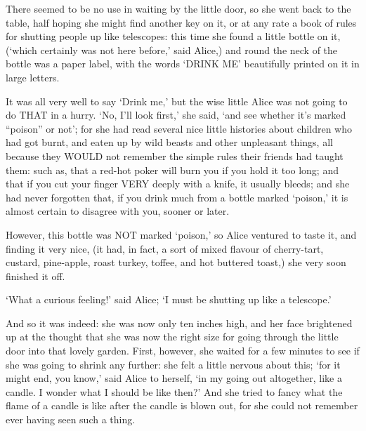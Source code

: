 \documentclass[12pt]{book}
\begin{document}
\begin{Parallel}[p]{}{}
{There seemed to be no use in waiting by the little door, so she went back to the table, half hoping she might find another key on it, or at any rate a book of rules for shutting people up like telescopes: this time she found a little bottle on it, (‘which certainly was not here before,’ said Alice,) and round the neck of the bottle was a paper label, with the words ‘DRINK ME’ beautifully printed on it in large letters.

It was all very well to say ‘Drink me,’ but the wise little Alice was not going to do THAT in a hurry. ‘No, I’ll look first,’ she said, ‘and see whether it’s marked “poison” or not’; for she had read several nice little histories about children who had got burnt, and eaten up by wild beasts and other unpleasant things, all because they WOULD not remember the simple rules their friends had taught them: such as, that a red-hot poker will burn you if you hold it too long; and that if you cut your finger VERY deeply with a knife, it usually bleeds; and she had never forgotten that, if you drink much from a bottle marked ‘poison,’ it is almost certain to disagree with you, sooner or later.

However, this bottle was NOT marked ‘poison,’ so Alice ventured to taste it, and finding it very nice, (it had, in fact, a sort of mixed flavour of cherry-tart, custard, pine-apple, roast turkey, toffee, and hot buttered toast,) she very soon finished it off.

\begin{center}
\quad*\quad*\quad*\quad*\quad*\quad*\quad*
\par
\quad*\quad*\quad*\quad*\quad*\quad*
\par
\quad*\quad*\quad*\quad*\quad*\quad*\quad*
\end{center}

‘What a curious feeling!’ said Alice; ‘I must be shutting up like a telescope.’

And so it was indeed: she was now only ten inches high, and her face brightened up at the thought that she was now the right size for going through the little door into that lovely garden. First, however, she waited for a few minutes to see if she was going to shrink any further: she felt a little nervous about this; ‘for it might end, you know,’ said Alice to herself, ‘in my going out altogether, like a candle. I wonder what I should be like then?’ And she tried to fancy what the flame of a candle is like after the candle is blown out, for she could not remember ever having seen such a thing.

}
\end{Parallel}
\end{document}
